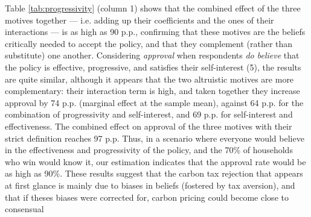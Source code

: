 \documentclass[11pt]{article}
\begin{document}

Table \ref{tab:progressivity} (column 1) shows that the combined effect of the three motives together --- i.e. adding up their coefficients and the ones of their interactions --- is as high as 90 p.p., confirming that these motives are the beliefs critically needed to accept the policy, and that they complement (rather than substitute) one another. Considering \textit{approval} when respondents \textit{do believe} that the policy is effective, progressive, and satisfies their self-interest (5), the results are quite similar, although it appears that the two altruistic motives are more complementary: their interaction term is high, and taken together they increase approval by 74 p.p. (marginal effect at the sample mean), against 64 p.p. for the combination of progressivity and self-interest, and 69 p.p. for self-interest and effectiveness. The combined effect on approval of the three motives with their strict definition reaches 97 p.p. Thus, in a scenario where everyone would believe in the effectiveness and progressivity of the policy, and the 70\% of households who win would know it, our estimation indicates that the approval rate would be as high as 90\%. These results suggest that the carbon tax rejection that appears at first glance is mainly due to biases in beliefs (fostered by tax aversion), and that if theses biases were corrected for, carbon pricing could become close to consensual
\end{document}
